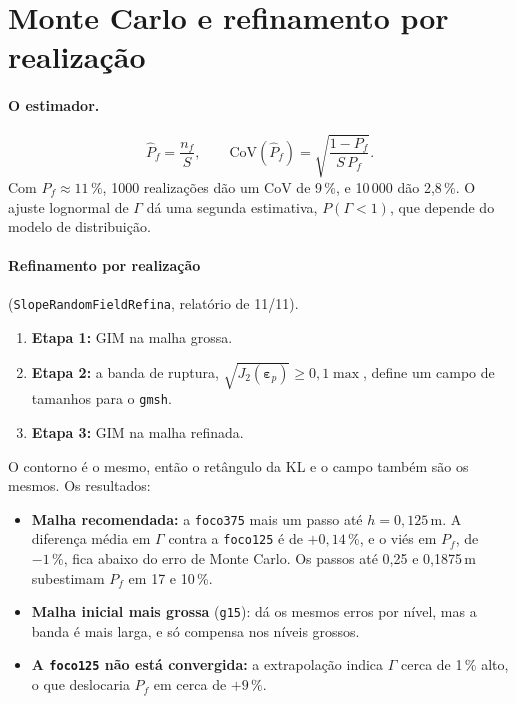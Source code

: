 \section{Monte Carlo e refinamento por realização}
\label{sec:mc}

\paragraph{O estimador.}
\begin{equation}
  \hat P_f = \frac{n_f}{S}, \qquad \mathrm{CoV}(\hat P_f) = \sqrt{\frac{1 - P_f}{S\, P_f}} .
\end{equation}
Com $P_f \approx 11\,\%$, 1000 realizações dão um CoV de 9\,\%, e 10\,000 dão 2,8\,\%. O ajuste lognormal de $\Gamma$ dá
uma segunda estimativa, $P(\Gamma < 1)$, que depende do modelo de distribuição.

\paragraph{Refinamento por realização} (\texttt{SlopeRandomFieldRefina}, relatório de 11/11).
\begin{enumerate}
  \item \textbf{Etapa 1:} GIM na malha grossa.
  \item \textbf{Etapa 2:} a banda de ruptura, $\sqrt{J_2(\bm\varepsilon_p)} \geq 0{,}1 \max$, define um campo de tamanhos
    para o \texttt{gmsh}.
  \item \textbf{Etapa 3:} GIM na malha refinada.
\end{enumerate}
O contorno é o mesmo, então o retângulo da KL e o campo também são os mesmos. Os resultados:
\begin{itemize}
  \item \textbf{Malha recomendada:} a \texttt{foco375} mais um passo até $h = 0{,}125$\,m. A diferença média em
    $\Gamma$ contra a \texttt{foco125} é de $+0{,}14\,\%$, e o viés em $P_f$, de $-1\,\%$, fica abaixo do erro de Monte
    Carlo. Os passos até 0,25 e 0,1875\,m subestimam $P_f$ em 17 e 10\,\%.
  \item \textbf{Malha inicial mais grossa} (\texttt{g15}): dá os mesmos erros por nível, mas a banda é mais larga, e só
    compensa nos níveis grossos.
  \item \textbf{A \texttt{foco125} não está convergida:} a extrapolação indica $\Gamma$ cerca de 1\,\% alto, o que
    deslocaria $P_f$ em cerca de $+9\,\%$.
\end{itemize}

